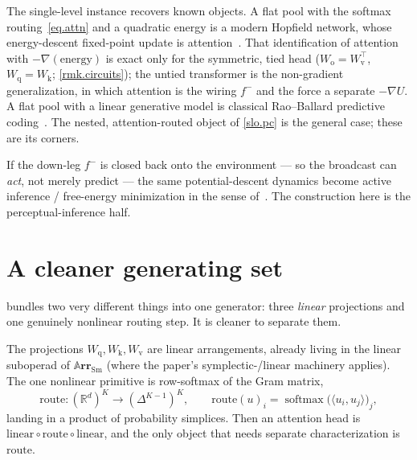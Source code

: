\documentclass[11pt]{article}
\theoremstyle{plain}
\theoremstyle{definition}
\theoremstyle{remark}
\newcommand{\rr}{\mathbb{R}}
\newcommand{\Cat}[1]{\mathbf{#1}}
\newcommand{\Sm}{\mathrm{Sm}}
\newcommand{\arr}{\mathbb{A}\Cat{rr}}    %
\newcommand{\sarr}{\arr_{\Sm}}           %
\newcommand{\inpt}[1]{#1^{-}}
\DeclareMathOperator{\softmax}{softmax}
\newcommand{\Wq}{W_{\mathrm q}}
\newcommand{\Wk}{W_{\mathrm k}}
\newcommand{\Wv}{W_{\mathrm v}}
\newcommand{\Wo}{W_{\mathrm o}}
\begin{document}
\begin{remark}\label{rmk.corners}
The single-level instance recovers known objects. A flat pool with the
softmax routing~\eqref{eq.attn} and a quadratic energy is a modern
Hopfield network, whose energy-descent fixed-point update is
attention~\cite{HopfieldAllYou}. That identification of attention with
$-\nabla(\text{energy})$ is exact only for the symmetric, tied head
($\Wo=\Wv^{\top}$, $\Wq=\Wk$; \cref{rmk.circuits}); the untied transformer
is the non-gradient generalization, in which attention is the wiring
$\inpt f$ and the force a separate $-\nabla U$. A flat pool with a linear generative
model is classical Rao--Ballard predictive coding~\cite{RaoBallard}. The
nested, attention-routed object of \cref{slo.pc} is the general case;
these are its corners.
\end{remark}

\begin{remark}\label{rmk.active}
If the down-leg $\inpt f$ is closed back onto the environment --- so the
broadcast can \emph{act}, not merely predict --- the same potential-descent
dynamics become active inference / free-energy minimization in the sense
of~\cite{Friston}. The construction here is the perceptual-inference half.
\end{remark}

\section{A cleaner generating set}\label{sec.generators}

 bundles two very different things into one generator: three
\emph{linear} projections and one genuinely nonlinear routing step. It is
cleaner to separate them.

\begin{construction}\label{con.factor}
The projections $\Wq,\Wk,\Wv$ are linear arrangements, already living in
the linear suboperad of $\sarr$ (where the paper's symplectic-/linear
machinery applies). The one nonlinear primitive is row-softmax of the Gram
matrix,
\[
  \mathrm{route}\colon (\rr^{d})^{K}\longrightarrow (\Delta^{K-1})^{K},
  \qquad
  \mathrm{route}(u)_{i}=\softmax\bigl(\langle u_i,u_j\rangle\bigr)_{j},
\]
landing in a product of probability simplices. Then an attention head is
$\mathrm{linear}\circ\mathrm{route}\circ\mathrm{linear}$, and the only
object that needs separate characterization is $\mathrm{route}$.
\end{construction}
\end{document}
